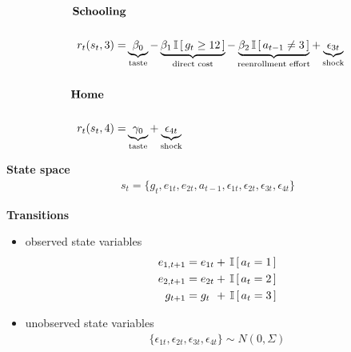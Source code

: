 \begin{frame}

\begin{align*}
\text{\textbf{Schooling}} & \\
& \\
r_t(s_t, 3) = & \underbrace{\beta_0}_{\text{taste}} - \underbrace{\beta_1 \,\mathbb{I}\,[\,g_t \geq 12\,]}_{\text{direct cost}} - \underbrace{\beta_2\,\mathbb{I}\,[\,a_{t - 1} \neq 3\,]}_{\text{reenrollment effort}} + \underbrace{\epsilon_{3t}}_{\text{shock}} \\
& \\
\text{\textbf{Home}}\qquad & \\
& \\
r_t(s_t, 4) = & \underbrace{\gamma_0}_{\text{taste}} + \underbrace{\epsilon_{4t}}_{\text{shock}}
\end{align*}
\end{frame}
\begin{frame}

\textbf{State space}\vspace{0.3cm}
\begin{align*}
	s_t = \{g_t,e_{1t},e_{2t},a_{t - 1},\epsilon_{1t},\epsilon_{2t},\epsilon_{3t},\epsilon_{4t}\}
\end{align*}

\end{frame}
\begin{frame}
  \textbf{Transitions}\vspace{0.5cm}
\begin{itemize}
\item observed state variables
\begin{align*}
    e_{1,t+1} &= e_{1t} + \,\mathbb{I}\,[\,a_t = 1\,] \\
    e_{2,t+1} &= e_{2t} + \,\mathbb{I}\,[\,a_t = 2\,] \\
    g_{t+1}   &= g_{t\phantom{2}}    +  \,\mathbb{I}\,[\,a_t = 3\,]\\
\end{align*}
\item unobserved state variables
\begin{align*}
\{\epsilon_{1t},\epsilon_{2t},\epsilon_{3t},\epsilon_{4t}\} \sim N(0, \Sigma)
\end{align*}
\end{itemize}
\end{frame}
